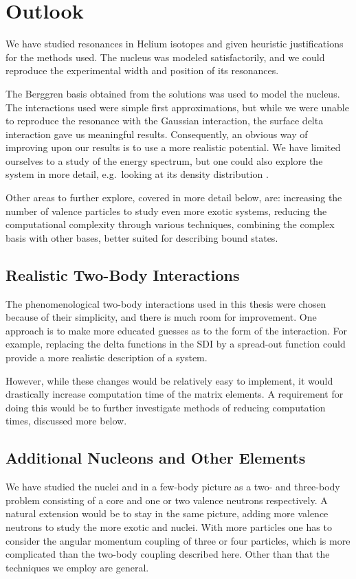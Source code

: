 \documentclass[../main/report.tex]{subfiles}
\begin{document}
\chapter{Outlook}
\label{cha:outlook}

We have studied resonances in Helium isotopes and given heuristic justifications for the methods used. The  nucleus was modeled satisfactorily, and we could reproduce the experimental width and position of its resonances.

The Berggren basis obtained from the  solutions was used to model the  nucleus. The interactions used were simple first approximations, but while we were unable to reproduce the  resonance with the Gaussian interaction, the surface delta interaction gave us meaningful results.
Consequently, an obvious way of improving upon our results is to use a more realistic potential. 
We have limited ourselves to a study of the energy spectrum, but one could also explore the  system in more detail, e.g.~looking at its density distribution \cite{radii}.

Other areas to further explore, covered in more detail below, are: increasing the number of valence particles to study even more exotic systems, reducing the computational complexity through various techniques, combining the complex basis with other bases, better suited for describing bound states.

\section{Realistic Two-Body Interactions}
The phenomenological two-body interactions used in this thesis were chosen because of their simplicity, and there is much room for improvement. 
One approach is to make more educated guesses as to the form of the interaction. 
For example, replacing the delta functions in the SDI by a spread-out function could provide a more realistic description of a system. 

However, while these changes would be relatively easy to implement, it would drastically increase computation time of the matrix elements. 
A requirement for doing this would be to further investigate methods of reducing computation times, discussed more below.  

\section{Additional Nucleons and Other Elements}
We have studied the nuclei  and  in a few-body picture as a two- and three-body problem consisting of a core and one or two valence neutrons respectively.
A natural extension would be to stay in the same picture, adding more valence neutrons to study the more exotic  and  nuclei.
With more particles one has to consider the angular momentum coupling of three or four particles, which is more complicated than the two-body coupling described here. Other than that the techniques we employ are general.
\end{document}
